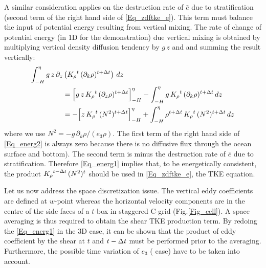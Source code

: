 \documentclass[NEMO_book]{subfiles}
\begin{document}
A similar consideration applies on the destruction rate of $\bar{e}$ due to stratification 
(second term of the right hand side of \eqref{Eq_zdftke_e}). This term 
must balance the input of potential energy resulting from vertical mixing. 
The rate of change of potential energy (in 1D for the demonstration) due vertical 
mixing is obtained by multiplying vertical density diffusion 
tendency by $g\,z$ and and summing the result vertically:
\begin{equation} \label{Eq_energ2}
\begin{split}
\int_{-H}^{\eta} g\,z\,\partial_z &\left( {K_\rho}^t \,(\partial_k \rho)^{t+\Delta t}   \right) \,dz    \\
&= \Bigl[  g\,z \,{K_\rho}^t \,(\partial_z \rho)^{t+\Delta t} \Bigr]_{-H}^{\eta}  
   - \int_{-H}^{\eta}{ g \,{K_\rho}^t \,(\partial_k \rho)^{t+\Delta t} } \,dz   \\
&= - \Bigl[  z\,{K_\rho}^t \,(N^2)^{t+\Delta t} \Bigr]_{-H}^{\eta}
+ \int_{-H}^{\eta}{  \rho^{t+\Delta t} \, {K_\rho}^t \,(N^2)^{t+\Delta t} \,dz  }
\end{split}
\end{equation}
where we use $N^2 = -g \,\partial_k \rho / (e_3 \rho)$. 
The first term of the right hand side of \eqref{Eq_energ2}  is always zero 
because there is no diffusive flux through the ocean surface and bottom). 
The second term is minus the destruction rate of  $\bar{e}$ due to stratification. 
Therefore \eqref{Eq_energ1} implies that, to be energetically consistent, the product 
${K_\rho}^{t-\Delta t}\,(N^2)^t$ should be used in \eqref{Eq_zdftke_e}, the TKE equation.

Let us now address the space discretization issue. 
The vertical eddy coefficients are defined at $w$-point whereas the horizontal velocity 
components are in the centre of the side faces of a $t$-box in staggered C-grid 
(Fig.\ref{Fig_cell}). A space averaging is thus required to obtain the shear TKE production term.
By redoing the \eqref{Eq_energ1} in the 3D case, it can be shown that the product of 
eddy coefficient by the shear at $t$ and $t-\Delta t$ must be performed prior to the averaging.
Furthermore, the possible time variation of $e_3$ ( case) have to be taken into 
account.
\end{document}
